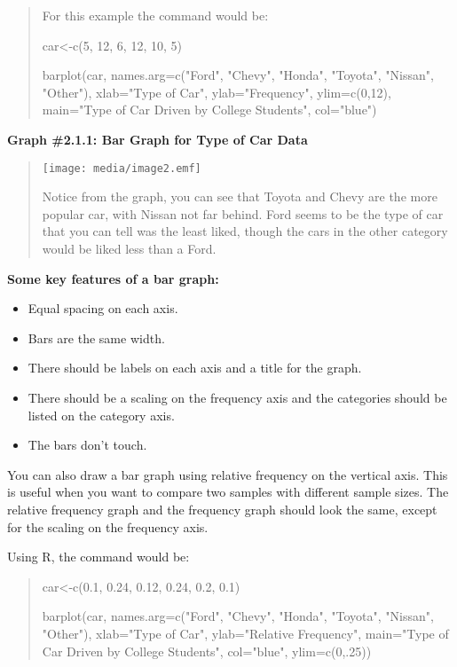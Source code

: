 \documentclass[]{book}
\begin{document}
\begin{quote}
For this example the command would be:

car\textless{}-c(5, 12, 6, 12, 10, 5)

barplot(car, names.arg=c("Ford", "Chevy", "Honda", "Toyota",
"Nissan", "Other"), xlab="Type of Car", ylab="Frequency",
ylim=c(0,12), main="Type of Car Driven by College Students",
col="blue")
\end{quote}

\textbf{Graph \#2.1.1: Bar Graph for Type of Car Data}

\begin{quote}
\texttt{[image: media/image2.emf]}

Notice from the graph, you can see that Toyota and Chevy are the more
popular car, with Nissan not far behind. Ford seems to be the type of
car that you can tell was the least liked, though the cars in the
other category would be liked less than a Ford.
\end{quote}

\textbf{Some key features of a bar graph:}

\begin{itemize}
\item
  Equal spacing on each axis.
\item
  Bars are the same width.
\item
  There should be labels on each axis and a title for the graph.
\item
  There should be a scaling on the frequency axis and the categories
  should be listed on the category axis.
\item
  The bars don't touch.
\end{itemize}

You can also draw a bar graph using relative frequency on the vertical
axis. This is useful when you want to compare two samples with different
sample sizes. The relative frequency graph and the frequency graph
should look the same, except for the scaling on the frequency axis.

Using R, the command would be:

\begin{quote}
car\textless{}-c(0.1, 0.24, 0.12, 0.24, 0.2, 0.1)

barplot(car, names.arg=c("Ford", "Chevy", "Honda", "Toyota",
"Nissan", "Other"), xlab="Type of Car", ylab="Relative
Frequency", main="Type of Car Driven by College Students",
col="blue", ylim=c(0,.25))
\end{quote}
\end{document}
